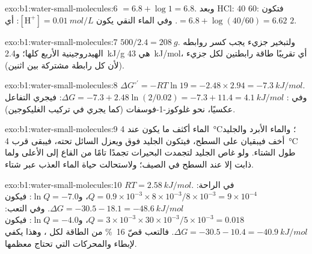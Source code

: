\begin{solution}{exo:b1:water-small-molecules:6}
 $= 6.8 + \log 1 = 6.8$. وبعد HCl:  $40$  $60$:
فتكون  $= 6.8 +
\log(40/60) = 6.62$. وفي الماء النقي يكون
$[\mathrm{H^+}] = \qty{0.01}{mol/L}$: أي  $2$.
\end{solution}

\begin{solution}{exo:b1:water-small-molecules:7}
$500/2.4 = \qty{208}{g}$. ولتبخير جزيء يجب كسر روابطه الهيدروجينية
الأربع كلها؛ و\qty{2.4}{kJ/g} هي \qty{43}{kJ/mol}، أي تقريبًا طاقة
رابطتين لكل جزيء (لأن كل رابطة مشتركة بين اثنين).
\end{solution}

\begin{solution}{exo:b1:water-small-molecules:8}
$\Delta G^{\circ\prime} = -RT\ln 19 = -2.48\times 2.94 =
\qty{-7.3}{kJ/mol}$. وفي :
$\Delta G = -7.3 + 2.48\ln(2/0.02) =
-7.3 + 11.4 = \qty{+4.1}{kJ/mol}$:
فيجري التفاعل عكسيًا، نحو غلوكوز-1-فوسفات (كما يجري في تركيب
الغليكوجين).
\end{solution}

\begin{solution}{exo:b1:water-small-molecules:9}
الماء أكثف ما يكون عند \qty{4}{\celsius}؛ والماء الأبرد والجليد أخف
فيبقيان على السطح، فيتكون الجليد فوق ويعزل السائل تحته، فيبقى قرب
\qty{4}{\celsius} طول الشتاء. ولو غاص الجليد لتجمدت البحيرات تجمدًا
تامًا من القاع إلى الأعلى ولما ذابت إلا عند السطح في الصيف؛ ولاستحالت
حياة الماء العذب عبر شتاء.
\end{solution}

\begin{solution}{exo:b1:water-small-molecules:10}
$RT = \qty{2.58}{kJ/mol}$. في الراحة:
$Q = 0.9\times 10^{-3}\times 8\times
10^{-3}/8\times 10^{-3} = 9\times 10^{-4}$،
و$\ln Q = -7.0$: فيكون $\Delta G =
-30.5 - 18.1 = \qty{-48.6}{kJ/mol}$.
وفي التعب: $Q = 3\times 10^{-3}\times
30\times 10^{-3}/5\times 10^{-3} = 0.018$،
و$\ln Q = -4.0$: فيكون $\Delta G =
-30.5 - 10.4 = \qty{-40.9}{kJ/mol}$.
فالتعب قصّ \qty{16}{\%} من الطاقة لكل ، وهذا يكفي لإبطاء 
والمحركات التي تحتاج معظمها.
\end{solution}

